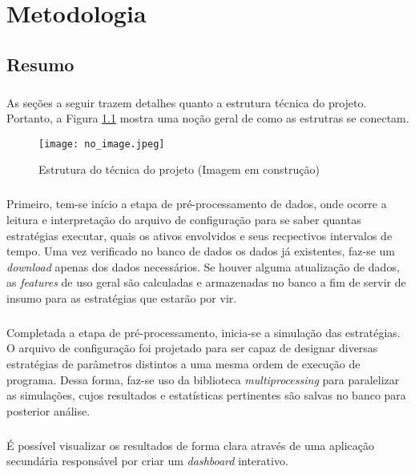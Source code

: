 \chapter{Metodologia}
\label{cap3}

\section{Resumo}

\paragraph{} As seções a seguir trazem detalhes quanto a estrutura técnica do projeto. Portanto, a Figura \ref{fig:100} mostra uma noção geral de como as estrutras se conectam.

\begin{figure}[h]
    \texttt{[image: no\_image.jpeg]}
    \centering
    \caption{Estrutura do técnica do projeto (Imagem em construção)}
    \label{fig:100}
\end{figure}

\paragraph{} Primeiro, tem-se início a etapa de pré-processamento de dados, onde ocorre a leitura e interpretação do arquivo de configuração para se saber quantas estratégias executar, quais os ativos envolvidos e seus recpectivos intervalos de tempo. Uma vez verificado no banco de dados os dados já existentes, faz-se um \textit{download} apenas dos dados necessários. Se houver alguma atualização de dados, as \textit{features} de uso geral são calculadas e armazenadas no banco a fim de servir de insumo para as estratégias que estarão por vir.

\paragraph{} Completada a etapa de pré-processamento, inicia-se a simulação das estratégias. O arquivo de configuração foi projetado para ser capaz de designar diversas estratégias de parâmetros distintos a uma mesma ordem de execução de programa. Dessa forma, faz-se uso da biblioteca \textit{multiprocessing} para paralelizar as simulações, cujos resultados e estatísticas pertinentes são salvas no banco para posterior análise.

\paragraph{} É possível visualizar os resultados de forma clara através de uma aplicação secundária responsável por criar um \textit{dashboard} interativo.

